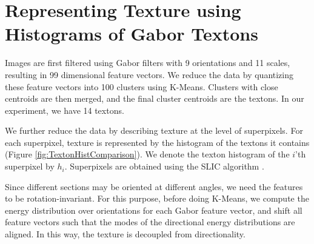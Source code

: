 \documentclass{llncs}
\begin{document}



\section{Representing Texture using Histograms of Gabor Textons} 

%
%
%

Images are first filtered using Gabor filters\cite{jain1990unsupervised, clausi2000designing} with 9 orientations and 11 scales, resulting in 99 dimensional feature vectors. We reduce the data by quantizing these feature vectors into 100 clusters using K-Means. Clusters with close centroids are then merged, and the final cluster centroids are the textons. In our experiment, we have 14 textons.


We further reduce the data by describing texture at the level of superpixels. For each superpixel, texture is represented by the histogram of the textons it contains (Figure \ref{fig:TextonHistComparison}). We denote the texton histogram of the $i$'th superpixel by $h_i$. Superpixels are obtained using the SLIC algorithm \cite{achanta2012slic}.

Since different sections may be oriented at different angles, 
we need the features to be rotation-invariant. For this purpose, before doing K-Means, we compute the energy distribution over orientations for each Gabor feature vector, and shift all feature vectors such that the modes of the directional energy distributions are aligned. In this way, the texture is decoupled from directionality.
\end{document}

